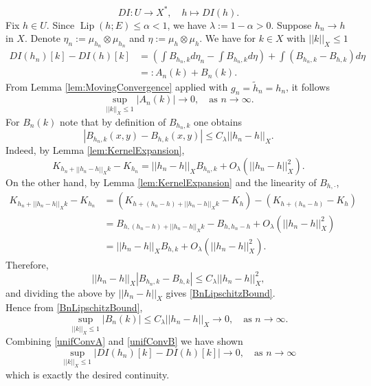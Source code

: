 \documentclass[11pt]{article}
\theoremstyle{plain}
\numberwithin{equation}{section}
\theoremstyle{definition}
\let\oldendproof\endproof
\renewenvironment{proof}[1][\proofname]{%
\oldproof[\upshape \bfseries #1]%
}{\oldendproof}
\DeclareMathOperator{\Lip}{Lip}
\begin{document}
\begin{proof}[Proof of Proposition \ref{prop:C1Diff}]
\[        DI:U \to X^*,\quad h \mapsto DI(h).
        \]
        Fix $h \in U$. Since $\Lip(h;E)\leq \alpha<1$, we have $\lambda:=1-\alpha>0$. Suppose $h_n \to h$ in $X$. Denote $\eta_n :=\mu_{h_n}\otimes \mu_{h_n}$ and $\eta:=\mu_{h}\otimes \mu_{h}$. We have for $k \in X$ with $||k||_X\leq 1$
        \begin{align*}
            DI(h_n)[k]-DI(h)[k]&=\left(\int B_{h_n,k}d\eta_n-\int B_{h_n,k}d\eta\right)+\int(B_{h_n,k}-B_{h,k})d\eta\\
            &=:A_n(k)+B_n(k).
        \end{align*}
        From Lemma \ref{lem:MovingConvergence} applied with $g_n=\tilde h_n=h_n$, it follows
        \begin{equation}
            \label{unifConvA}
            \sup_{||k||_X\leq 1}|A_n(k)|\to 0,\quad \text{as }n \to \infty.
        \end{equation}
        For $B_n(k)$ note that by definition of $B_{h_n,k}$ one obtains
        \begin{equation}
            \label{BnLipschitzBound}
            |B_{h_n,k}(x,y)-B_{h,k}(x,y)|\leq C_\lambda||h_n-h||_X.
        \end{equation}
        Indeed, by Lemma \ref{lem:KernelExpansion},
        \[
        K_{h_n+||h_n-h||_Xk}-K_{h_n}
        =
        ||h_n-h||_X B_{h_n,k}
        +
        O_\lambda(||h_n-h||_X^2).
        \]
        On the other hand, by Lemma \ref{lem:KernelExpansion} and the linearity of $B_{h,\cdot}$,
        \[
        \begin{aligned}
        K_{h_n+||h_n-h||_Xk}-K_{h_n}
        &=
        (K_{h+(h_n-h)+||h_n-h||_Xk}-K_h)
        -(K_{h+(h_n-h)}-K_h)
        \\
        &=
        B_{h,(h_n-h)+||h_n-h||_Xk}
        -B_{h,h_n-h}
        +
        O_\lambda(||h_n-h||_X^2)
        \\
        &=
        ||h_n-h||_X B_{h,k}
        +
        O_\lambda(||h_n-h||_X^2).
        \end{aligned}
        \]
        Therefore,
        \[
        ||h_n-h||_X
        |B_{h_n,k}-B_{h,k}|
        \leq
        C_\lambda ||h_n-h||_X^2,
        \]
        and dividing the above by $||h_n-h||_X$ gives \eqref{BnLipschitzBound}.\\
        Hence from \eqref{BnLipschitzBound},
        \begin{equation}
            \label{unifConvB}
            \sup_{||k||_X\leq 1}|B_n(k)|\leq C_\lambda ||h_n-h||_X\to 0,\quad \text{as }n \to \infty.
        \end{equation}
        Combining \eqref{unifConvA} and \eqref{unifConvB} we have shown
        \[
        \sup_{||k||_X\leq 1}| DI(h_n)[k]-DI(h)[k]|\to 0, \quad \text{as }n \to \infty
        \]
        which is exactly the desired continuity.
    \end{proof}
\end{document}
